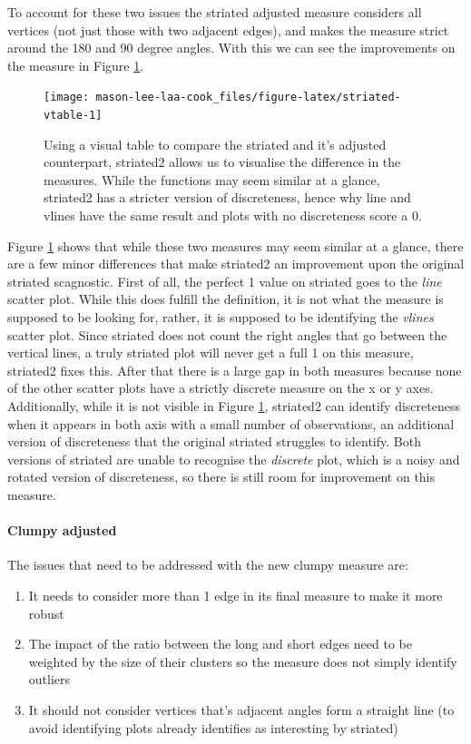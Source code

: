 To account for these two issues the striated adjusted measure considers all vertices (not just those with two adjacent edges), and makes the measure strict around the 180 and 90 degree angles. With this we can see the improvements on the measure in Figure \ref{fig:striated-vtable}.

\begin{figure}
\texttt{[image: mason-lee-laa-cook\_files/figure-latex/striated-vtable-1]} \caption{Using a visual table to compare the striated and it's adjusted counterpart, striated2 allows us to visualise the difference in the measures. While the functions may seem similar at a glance, striated2 has a stricter version of discreteness, hence why line and vlines have the same result and plots with no discreteness score a 0.}\label{fig:striated-vtable}
\end{figure}

Figure \ref{fig:striated-vtable} shows that while these two measures may seem similar at a glance, there are a few minor differences that make striated2 an improvement upon the original striated scagnostic. First of all, the perfect 1 value on striated goes to the \emph{line} scatter plot. While this does fulfill the definition, it is not what the measure is supposed to be looking for, rather, it is supposed to be identifying the \emph{vlines} scatter plot. Since striated does not count the right angles that go between the vertical lines, a truly striated plot will never get a full 1 on this measure, striated2 fixes this. After that there is a large gap in both measures because none of the other scatter plots have a strictly discrete measure on the x or y axes. Additionally, while it is not visible in Figure \ref{fig:striated-vtable}, striated2 can identify discreteness when it appears in both axis with a small number of observations, an additional version of discreteness that the original striated struggles to identify. Both versions of striated are unable to recognise the \emph{discrete} plot, which is a noisy and rotated version of discreteness, so there is still room for improvement on this measure.

\paragraph{Clumpy adjusted}\label{clumpy-adjusted}

The issues that need to be addressed with the new clumpy measure are:

\begin{enumerate}
\def\labelenumi{\arabic{enumi}.}
\tightlist
\item
  It needs to consider more than 1 edge in its final measure to make it more robust
\item
  The impact of the ratio between the long and short edges need to be weighted by the size of their clusters so the measure does not simply identify outliers
\item
  It should not consider vertices that's adjacent angles form a straight line (to avoid identifying plots already identifies as interesting by striated)
\end{enumerate}

